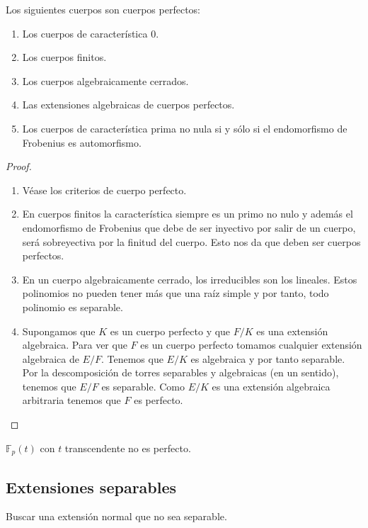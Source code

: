 \begin{proposition}
Los siguientes cuerpos son cuerpos perfectos:

\begin{enumerate}
\item Los cuerpos de característica 0. 
\item Los cuerpos finitos. 
\item Los cuerpos algebraicamente cerrados. 
\item Las extensiones algebraicas de cuerpos perfectos.
\item Los cuerpos de característica prima no nula si y sólo si el endomorfismo de Frobenius es automorfismo.
\end{enumerate}
\end{proposition}
\begin{proof}
\begin{enumerate}
\item Véase los criterios de cuerpo perfecto. 
\item En cuerpos finitos la característica siempre es un primo no nulo y además el endomorfismo de Frobenius que debe de ser inyectivo por salir de un cuerpo, será sobreyectiva por la finitud del cuerpo. Esto nos da que deben ser cuerpos perfectos. 
\item En un cuerpo algebraicamente cerrado, los irreducibles son los lineales. Estos polinomios no pueden tener más que una raíz simple y por tanto, todo polinomio es separable.
\item Supongamos que $K$ es un cuerpo perfecto y que $F/K$ es una extensión algebraica. Para ver que $F$ es un cuerpo perfecto tomamos cualquier extensión algebraica de $E/F$. Tenemos que $E/K$ es algebraica y por tanto separable. Por la descomposición de torres separables y algebraicas (en un sentido), tenemos que $E/F$ es separable. Como $E/K$ es una extensión algebraica arbitraria tenemos que $F$ es perfecto.  
\end{enumerate}
\end{proof}

\begin{example}
$\mathbb{F}_p(t)$ con $t$ transcendente no es perfecto. 
\end{example}

\subsection{Extensiones separables}

\begin{exercise}
Buscar una extensión normal que no sea separable.
\end{exercise}

